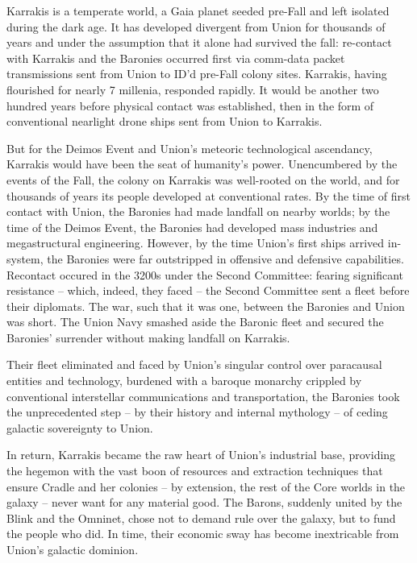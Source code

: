                                                                                                                


Karrakis is a temperate world, a Gaia planet seeded pre-Fall and left isolated during the dark age.  
It has developed divergent from Union for thousands of years and under the assumption that it  
alone had survived the fall: re-contact with Karrakis and the Baronies occurred first via comm-data  
packet transmissions sent from Union to ID’d pre-Fall colony sites. Karrakis, having flourished for  
nearly 7 millenia, responded rapidly. It would be another two hundred years before physical  
contact was established, then in the form of conventional nearlight drone ships sent from Union to  
Karrakis.   

But for the Deimos Event and Union’s meteoric technological ascendancy, Karrakis would have  
been the seat of humanity’s power. Unencumbered by the events of the Fall, the colony on  
Karrakis was well-rooted on the world, and for thousands of years its people developed at  
conventional rates. By the time of first contact with Union, the Baronies had made landfall on  
nearby worlds; by the time of the Deimos Event, the Baronies had developed mass industries and  
megastructural engineering. However, by the time Union’s first ships arrived in-system, the  
Baronies were far outstripped in offensive and defensive capabilities. Recontact occured in the  
3200s under the Second Committee: fearing significant resistance -- which, indeed, they faced --  
the Second Committee sent a fleet before their diplomats. The war, such that it was one, between  
the Baronies and Union was short. The Union Navy smashed aside the Baronic fleet and secured  
the Baronies’ surrender without making landfall on Karrakis.    

Their fleet eliminated and faced by Union’s singular control over paracausal entities and  
technology, burdened with a baroque monarchy crippled by conventional interstellar  
communications and transportation, the Baronies took the unprecedented step -- by their history  
and internal mythology -- of ceding galactic sovereignty to Union.    

In return, Karrakis became the raw heart of Union’s industrial base, providing the hegemon with  
the vast boon of resources and extraction techniques that ensure Cradle and her colonies -- by  
extension, the rest of the Core worlds in the galaxy -- never want for any material good. The  
Barons, suddenly united by the Blink and the Omninet, chose not to demand rule over the galaxy,  
but to fund the people who did. In time, their economic sway has become inextricable from  
Union’s galactic dominion.   


